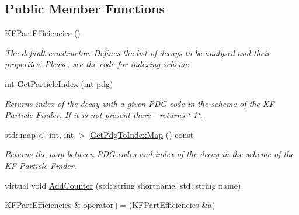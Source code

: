 \subsection*{Public Member Functions}
\begin{DoxyCompactItemize}
\item 
\hyperlink{classKFPartEfficiencies_a0559adf38115aa40fc8fa96a7d2b2abd}{K\+F\+Part\+Efficiencies} ()\hypertarget{classKFPartEfficiencies_a0559adf38115aa40fc8fa96a7d2b2abd}{}\label{classKFPartEfficiencies_a0559adf38115aa40fc8fa96a7d2b2abd}

\begin{DoxyCompactList}\small\item\em The default constructor. Defines the list of decays to be analysed and their properties. Please, see the code for indexing scheme. \end{DoxyCompactList}\item 
int \hyperlink{classKFPartEfficiencies_a604060167fb04565e2311cffbe680250}{Get\+Particle\+Index} (int pdg)\hypertarget{classKFPartEfficiencies_a604060167fb04565e2311cffbe680250}{}\label{classKFPartEfficiencies_a604060167fb04565e2311cffbe680250}

\begin{DoxyCompactList}\small\item\em Returns index of the decay with a given P\+DG code in the scheme of the KF Particle Finder. If it is not present there -\/ returns \char`\"{}-\/1\char`\"{}. \end{DoxyCompactList}\item 
std\+::map$<$ int, int $>$ \hyperlink{classKFPartEfficiencies_a282d31782b56c5f15e7e73b9c3409048}{Get\+Pdg\+To\+Index\+Map} () const \hypertarget{classKFPartEfficiencies_a282d31782b56c5f15e7e73b9c3409048}{}\label{classKFPartEfficiencies_a282d31782b56c5f15e7e73b9c3409048}

\begin{DoxyCompactList}\small\item\em Returns the map between P\+DG codes and index of the decay in the scheme of the KF Particle Finder. \end{DoxyCompactList}\item 
virtual void \hyperlink{classKFPartEfficiencies_ad91a958383aeb2750786fc5c5c4c9d22}{Add\+Counter} (std\+::string shortname, std\+::string name)
\item 
\hyperlink{classKFPartEfficiencies}{K\+F\+Part\+Efficiencies} \& \hyperlink{classKFPartEfficiencies_a3659f3482cc8d1b25139740d3507690e}{operator+=} (\hyperlink{classKFPartEfficiencies}{K\+F\+Part\+Efficiencies} \&a)\hypertarget{classKFPartEfficiencies_a3659f3482cc8d1b25139740d3507690e}{}\label{classKFPartEfficiencies_a3659f3482cc8d1b25139740d3507690e}


\end{DoxyCompactItemize}
